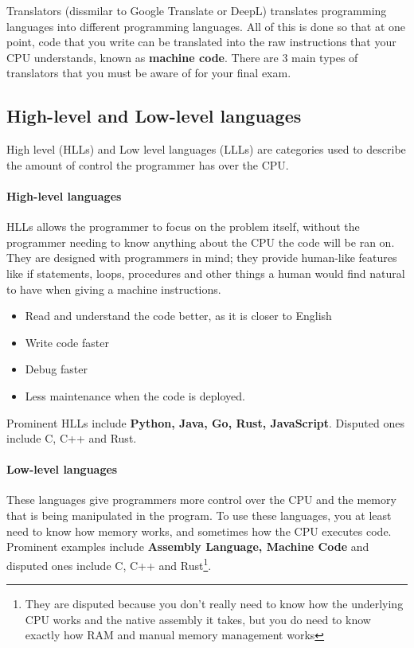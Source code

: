 \documentclass[../main.tex]{subfiles}
\begin{document}
Translators (dissmilar to Google Translate or DeepL) translates programming languages into different programming languages. All of this is done so that at one point, code that you write can be translated into the raw instructions that your CPU understands, known as \textbf{machine code}. There are 3 main types of translators that you must be aware of for your final exam.

\subsection{High-level and Low-level languages}

High level (HLLs) and Low level languages (LLLs) are categories used to describe the amount of control the programmer has over the CPU.

\paragraph{High-level languages}

HLLs allows the programmer to focus on the problem itself, without the programmer needing to know anything about the CPU the code will be ran on. They are designed with programmers in mind; they provide human-like features like if statements, loops, procedures and other things a human would find natural to have when giving a machine instructions. 

\begin{itemize}
    \item Read and understand the code better, as it is closer to English
    \item Write code faster
    \item Debug faster
    \item Less maintenance when the code is deployed.
\end{itemize}

Prominent HLLs include \textbf{Python, Java, Go, Rust, JavaScript}. Disputed ones include C, C++ and Rust.

\paragraph{Low-level languages}

These languages give programmers more control over the CPU and the memory that is being manipulated in the program. To use these languages, you at least need to know how memory works, and sometimes how the CPU executes code. Prominent examples include \textbf{Assembly Language, Machine Code} and disputed ones include C, C++ and Rust\footnote{They are disputed because you don't really need to know how the underlying CPU works and the native assembly it takes, but you do need to know exactly how RAM and manual memory management works}.
\end{document}
